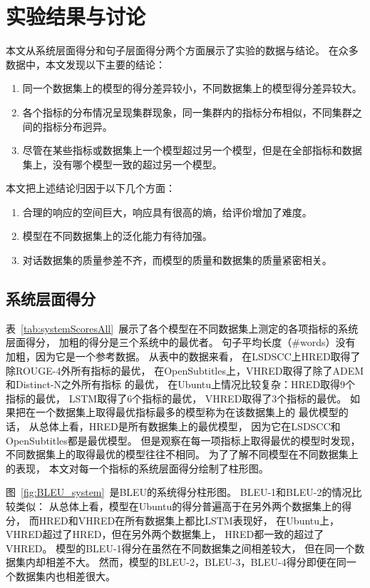 \chapter{实验结果与讨论}\label{ch:experiment}
本文从系统层面得分和句子层面得分两个方面展示了实验的数据与结论。 在众多数据中，本文发现以下主要的结论：
\begin{enumerate}
    \item 同一个数据集上的模型的得分差异较小，不同数据集上的模型得分差异较大。
    \item 各个指标的分布情况呈现集群现象，同一集群内的指标分布相似，不同集群之间的指标分布迥异。
    \item 尽管在某些指标或数据集上一个模型超过另一个模型，但是在全部指标和数据集上，没有哪个模型一致的超过另一个模型。
\end{enumerate}
本文把上述结论归因于以下几个方面：
\begin{enumerate}
    \item 合理的响应的空间巨大，响应具有很高的熵，给评价增加了难度。
    \item 模型在不同数据集上的泛化能力有待加强。
    \item 对话数据集的质量参差不齐，而模型的质量和数据集的质量紧密相关。
\end{enumerate}

\section{系统层面得分}\label{sec:system_scores}
表~\ref{tab:systemScoresAll}~展示了各个模型在不同数据集上测定的各项指标的系统层面得分， 加粗的得分是三个系统中的最优者。 句子平均长度（\#words）没有加粗，因为它是一个参考数据。 从表中的数据来看， 在LSDSCC上HRED取得了除ROUGE-4外所有指标的最优， 在OpenSubtitles上，VHRED取得了除了ADEM和Distinct-N之外所有指标 的最优， 在Ubuntu上情况比较复杂：HRED取得9个指标的最优， LSTM取得了6个指标的最优， VHRED取得了3个指标的最优。 如果把在一个数据集上取得最优指标最多的模型称为在该数据集上的 最优模型的话， 从总体上看，HRED是所有数据集上的最优模型， 因为它在LSDSCC和OpenSubtitles都是最优模型。 但是观察在每一项指标上取得最优的模型时发现， 不同数据集上的取得最优的模型往往不相同。 为了了解不同模型在不同数据集上的表现， 本文对每一个指标的系统层面得分绘制了柱形图。


图~\ref{fig:BLEU_system}~是BLEU的系统得分柱形图。 BLEU-1和BLEU-2的情况比较类似： 从总体上看，模型在Ubuntu的得分普遍高于在另外两个数据集上的得分， 而HRED和VHRED在所有数据集上都比LSTM表现好， 在Ubuntu上，VHRED超过了HRED，但在另外两个数据集上， HRED都一致的超过了VHRED。 模型的BLEU-1得分在虽然在不同数据集之间相差较大， 但在同一个数据集内却相差不大。 然而，模型的BLEU-2，BLEU-3，BLEU-4得分即便在同一个数据集内也相差很大。

